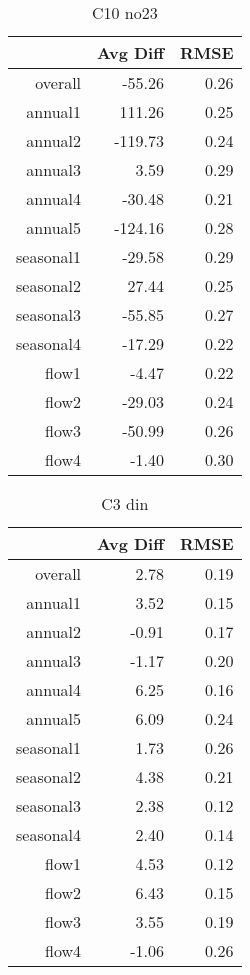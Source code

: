 \begin{table}[H]
\centering
\begin{tabular}{rrr}
  \hline
 & Avg Diff & RMSE \\ 
  \hline
overall & -55.26 & 0.26 \\ 
  annual1 & 111.26 & 0.25 \\ 
  annual2 & -119.73 & 0.24 \\ 
  annual3 & 3.59 & 0.29 \\ 
  annual4 & -30.48 & 0.21 \\ 
  annual5 & -124.16 & 0.28 \\ 
  seasonal1 & -29.58 & 0.29 \\ 
  seasonal2 & 27.44 & 0.25 \\ 
  seasonal3 & -55.85 & 0.27 \\ 
  seasonal4 & -17.29 & 0.22 \\ 
  flow1 & -4.47 & 0.22 \\ 
  flow2 & -29.03 & 0.24 \\ 
  flow3 & -50.99 & 0.26 \\ 
  flow4 & -1.40 & 0.30 \\ 
   \hline
\end{tabular}
\caption{C10 no23} 
\end{table}
\begin{table}[H]
\centering
\begin{tabular}{rrr}
  \hline
 & Avg Diff & RMSE \\ 
  \hline
overall & 2.78 & 0.19 \\ 
  annual1 & 3.52 & 0.15 \\ 
  annual2 & -0.91 & 0.17 \\ 
  annual3 & -1.17 & 0.20 \\ 
  annual4 & 6.25 & 0.16 \\ 
  annual5 & 6.09 & 0.24 \\ 
  seasonal1 & 1.73 & 0.26 \\ 
  seasonal2 & 4.38 & 0.21 \\ 
  seasonal3 & 2.38 & 0.12 \\ 
  seasonal4 & 2.40 & 0.14 \\ 
  flow1 & 4.53 & 0.12 \\ 
  flow2 & 6.43 & 0.15 \\ 
  flow3 & 3.55 & 0.19 \\ 
  flow4 & -1.06 & 0.26 \\ 
   \hline
\end{tabular}
\caption{C3 din} 
\end{table}
